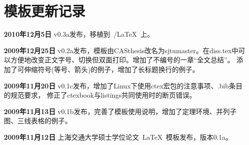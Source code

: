 \chapter{模板更新记录}
\label{chap:updatelog}

\textbf{2010年12月5日} v0.3a发布，移植到~\XeTeX/\LaTeX~上。

\textbf{2009年12月25日} v0.2a发布，模板由CASthesis改名为sjtumaster。在diss.tex中可以方便地改变正文字号、切换但双面打印。增加了不编号的一章“全文总结”。
添加了可伸缩符号(等号、箭头)的例子，增加了长标题换行的例子。

\textbf{2009年11月20日} v0.1c发布，增加了Linux下使用ctex宏包的注意事项、.bib条目的规范要求，
修正了ctexbook与listings共同使用时的断页错误。

\textbf{2009年11月13日} v0.1b发布，完善了模板使用说明，增加了定理环境、并列子图、三线表格的例子。

\textbf{2009年11月12日} 上海交通大学硕士学位论文~\LaTeX~模板发布，版本0.1a。

